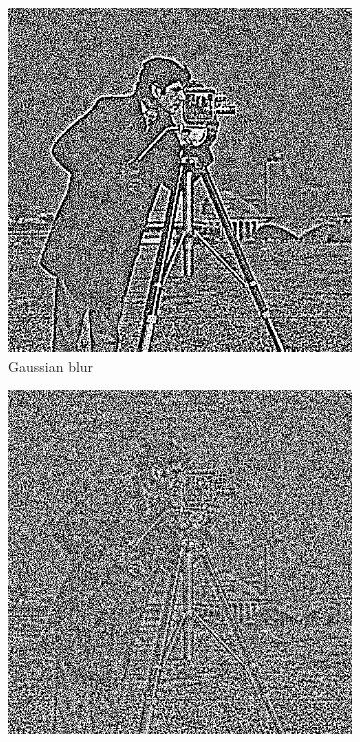 \documentclass[11pt]{article}
\begin{document}
\begin{figure}
\centering
\graphicspath{{images/}}
\begin{subfigure}[b]{0.4\textwidth}
\centering
\includegraphics[width=\textwidth]{camera_blur_diff}
\caption{Gaussian blur}
\label{camera:gauss:diff}
\end{subfigure}
\begin{subfigure}[b]{0.4\textwidth}
\centering
\includegraphics[width=\textwidth]{camera_ch_diff}

\end{subfigure}
\end{figure}
\end{document}
